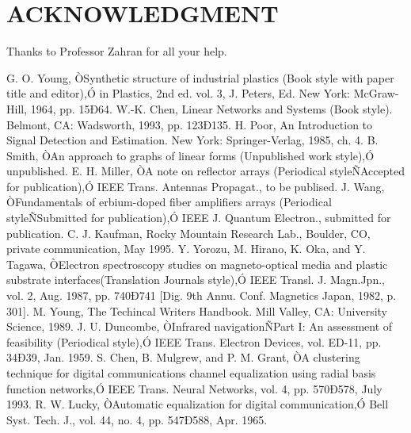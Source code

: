 \documentclass[letterpaper, 10 pt, conference]{ieeeconf}  %
\begin{document}


\section*{ACKNOWLEDGMENT}

Thanks to Professor Zahran for all your help.

\begin{thebibliography}{99}

 G. O. Young, ÒSynthetic structure of industrial plastics (Book style with paper title and editor),Ó 	in Plastics, 2nd ed. vol. 3, J. Peters, Ed.  New York: McGraw-Hill, 1964, pp. 15Ð64.
 W.-K. Chen, Linear Networks and Systems (Book style).	Belmont, CA: Wadsworth, 1993, pp. 123Ð135.
 H. Poor, An Introduction to Signal Detection and Estimation.   New York: Springer-Verlag, 1985, ch. 4.
 B. Smith, ÒAn approach to graphs of linear forms (Unpublished work style),Ó unpublished.
 E. H. Miller, ÒA note on reflector arrays (Periodical styleÑAccepted for publication),Ó IEEE Trans. Antennas Propagat., to be publised.
 J. Wang, ÒFundamentals of erbium-doped fiber amplifiers arrays (Periodical styleÑSubmitted for publication),Ó IEEE J. Quantum Electron., submitted for publication.
 C. J. Kaufman, Rocky Mountain Research Lab., Boulder, CO, private communication, May 1995.
 Y. Yorozu, M. Hirano, K. Oka, and Y. Tagawa, ÒElectron spectroscopy studies on magneto-optical media and plastic substrate interfaces(Translation Journals style),Ó IEEE Transl. J. Magn.Jpn., vol. 2, Aug. 1987, pp. 740Ð741 [Dig. 9th Annu. Conf. Magnetics Japan, 1982, p. 301].
 M. Young, The Techincal Writers Handbook.  Mill Valley, CA: University Science, 1989.
 J. U. Duncombe, ÒInfrared navigationÑPart I: An assessment of feasibility (Periodical style),Ó IEEE Trans. Electron Devices, vol. ED-11, pp. 34Ð39, Jan. 1959.
 S. Chen, B. Mulgrew, and P. M. Grant, ÒA clustering technique for digital communications channel equalization using radial basis function networks,Ó IEEE Trans. Neural Networks, vol. 4, pp. 570Ð578, July 1993.
 R. W. Lucky, ÒAutomatic equalization for digital communication,Ó Bell Syst. Tech. J., vol. 44, no. 4, pp. 547Ð588, Apr. 1965.

\end{thebibliography}
\end{document}
